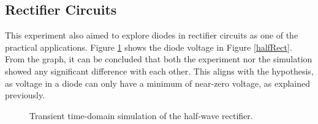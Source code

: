 \documentclass[11pt]{report}
\begin{document}
\subsection{Rectifier Circuits}
This experiment also aimed to explore diodes in rectifier circuits as one of the practical applications. Figure \ref{halfRectRes} shows the diode voltage in Figure \ref{halfRect}. From the graph, it can be concluded that both the experiment nor the simulation showed any significant difference with each other. This aligns with the hypothesis, as voltage in a diode can only have a minimum of near-zero voltage, as explained previously.
\begin{figure}[h]
	\centering
	\caption{Transient time-domain simulation of the half-wave rectifier.}
	\label{halfRectRes}
\end{figure}
\end{document}
